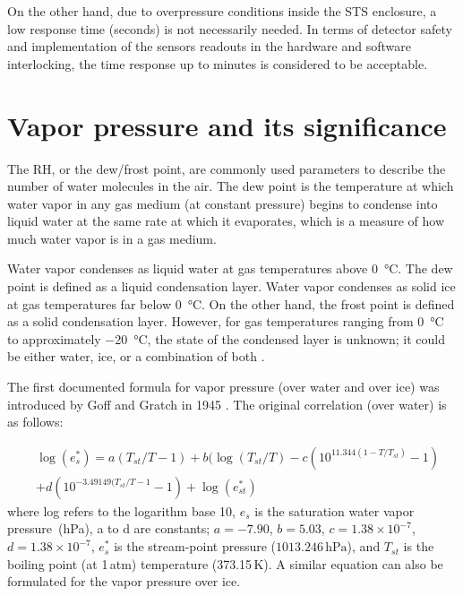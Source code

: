 On the other hand, due to overpressure conditions inside the \gls{STS} enclosure, a low response time (seconds) is not necessarily needed. In terms of detector safety and implementation of the sensors readouts in the hardware and software interlocking, the time response up to minutes is considered to be acceptable. 

\section{Vapor pressure and its significance}

The \gls{RH}, or the dew/frost point, are commonly used parameters to describe the number of water molecules in the air. The dew point is the temperature at which water vapor in any gas medium (at constant pressure) begins to condense into liquid water at the same rate at which it evaporates, which is a measure of how much water vapor is in a gas medium.

Water vapor condenses as liquid water at gas temperatures above \SI{0}{\celsius}. The dew point is defined as a liquid condensation layer. Water vapor condenses as solid ice at gas temperatures far below \SI{0}{\celsius}. On the other hand, the frost point is defined as a solid condensation layer. However, for gas temperatures ranging from \SI{0}{\celsius} to approximately \SI{-20}{\celsius}, the state of the condensed layer is unknown; it could be either water, ice, or a combination of both \cite{nie_dewpoint}. 


The first documented formula for vapor pressure (over water and over ice) was introduced by Goff and Gratch in 1945 \cite{goff_gratch}. The original correlation (over water) is as follows:

\begin{equation}
\label{gratch}
\begin{split}
    &\log({e}^{*}_{s}) = a(T_{st}/T - 1) + b(\log(T_{st}/T) - c(10^{11.344(1-T/T_{st})} - 1) \\
    &+ d(10^{-3.49149(T_{st}/T - 1} -1) + \log(e^{*}_{st})
\end{split}
\end{equation}
where log refers to the logarithm base 10, $e_{s}$ is the saturation water vapor pressure~(hPa), a to d are constants; $a = - 7.90$, $b=5.03$, $c=1.38\times10^{-7}$, $d=1.38\times10^{-7}$, $e^{*}_{s}$ is the stream-point pressure ($1013.246\,\mathrm{hPa}$), and $T_{st}$ is the boiling point (at 1\,atm) temperature (373.15\,K). A similar equation can also be formulated for the vapor pressure over ice. 

